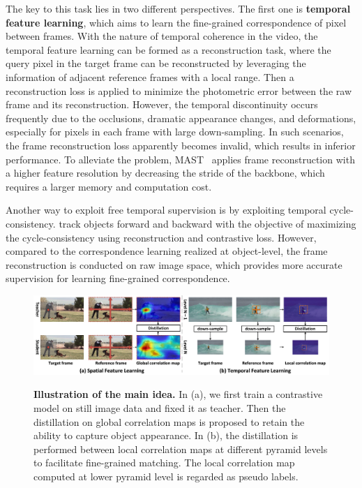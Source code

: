 \documentclass{article}
\begin{document}
The key to this task lies in two different perspectives. The first one is \textbf{temporal feature learning}, which aims to learn the fine-grained correspondence of pixel between frames. With the nature of temporal coherence in the video, the temporal feature learning can be formed as a reconstruction task, where the query pixel in the target frame can be reconstructed by leveraging the information of adjacent reference frames with a local range. Then a reconstruction loss is applied to minimize the photometric error between the raw frame and its reconstruction. However, the temporal discontinuity occurs frequently due to the occlusions, dramatic appearance changes, and deformations, especially for pixels in each frame with large down-sampling. In such scenarios, the frame reconstruction loss apparently becomes invalid, which results in inferior performance. To alleviate the problem, MAST~\cite{lai2020mast} applies frame reconstruction with a higher feature resolution by decreasing the stride of the backbone, which requires a larger memory and computation cost. 

Another way to exploit free temporal supervision is by exploiting temporal cycle-consistency.  \cite{jabri2020space}\cite{wang2019learning} track objects forward and backward with the objective of maximizing the cycle-consistency using  reconstruction and contrastive loss. However, compared to the correspondence learning realized at object-level, the frame reconstruction is conducted on raw image space, which provides more accurate supervision for learning fine-grained correspondence.

\begin{figure}[!tb]
  \centering
  {\includegraphics[width=1.0\textwidth]{figure/tissor/tissor.pdf}}
  \caption{\small \textbf{Illustration of the main idea.} In (a), we first train a contrastive model on still image data and fixed it as teacher. Then the distillation on global correlation maps is proposed to retain the ability to capture object appearance. In (b), the distillation is performed between local correlation maps at different pyramid levels to facilitate fine-grained matching. The local correlation map computed at lower pyramid level is regarded as pseudo labels.}
  \label{fig:tissor}
  \vspace{-7mm}
\end{figure}
\end{document}
